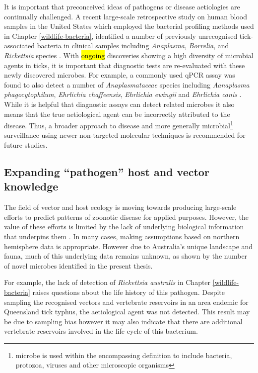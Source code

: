 \documentclass[a4paper, nobind]{templates/ociamthesis}
\begin{document}
It is important that preconceived ideas of pathogens or disease aetiologies are continually challenged.
A recent large-scale retrospective study on human blood samples in the United States which employed the bacterial profiling methods used in Chapter \ref{wildlife-bacteria}, identified a number of previously unrecognised tick-associated bacteria in clinical samples including \emph{Anaplasma}, \emph{Borrelia}, and \emph{Rickettsia} species \autocite{kingryTargetedMetagenomicsClinical2020}.
With \hl{ongoing} discoveries showing a high diversity of microbial agents in ticks, it is important that diagnostic tests are re-evaluated with these newly discovered microbes.
For example, a commonly used qPCR assay was found to also detect a number of \emph{Anaplasmataceae} species including \emph{Aanaplasma phagocytophilum}, \emph{Ehrlichia chaffeensis}, \emph{Ehrlichia ewingii} and \emph{Ehrlichia canis} \autocite{murphyPrevalenceDistributionHuman2017}.
While it is helpful that diagnostic assays can detect related microbes it also means that the true aetiological agent can be incorrectly attributed to the disease.
Thus, a broader approach to disease and more generally microbial\footnote{microbe is used within the encompassing definition to include bacteria, protozoa, viruses and other microscopic organisms} surveillance using newer non-targeted molecular techniques is recommended for future studies.

\hypertarget{expanding-pathogen-host-and-vector-knowledge}{%
\subsection{Expanding ``pathogen'' host and vector knowledge}\label{expanding-pathogen-host-and-vector-knowledge}}

The field of vector and host ecology is moving towards producing large-scale efforts to predict patterns of zoonotic disease for applied purposes.
However, the value of these efforts is limited by the lack of underlying biological information that underpins them \autocite{alberyFastlivedHostsZoonotic2020}.
In many cases, making assumptions based on northern hemisphere data is appropriate.
However due to Australia's unique landscape and fauna, much of this underlying data remains unknown, as shown by the number of novel microbes identified in the present thesis.

For example, the lack of detection of \emph{Rickettsia australis} in Chapter \ref{wildlife-bacteria} raises questions about the life history of this pathogen.
Despite sampling the recognised vectors and vertebrate reservoirs \autocite{campbellRickettsiosesAustraliaIsolation1974,sextonSpottedFeverGroup1991} in an area endemic for Queensland tick typhus, the aetiological agent was not detected.
This result may be due to sampling bias however it may also indicate that there are additional vertebrate reservoirs involved in the life cycle of this bacterium.
\end{document}
